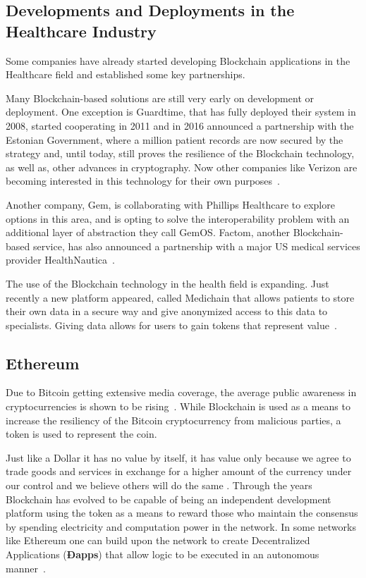 \subsection{Developments and Deployments in the Healthcare Industry}\label{blockchainHealthcare}

Some companies have already started developing Blockchain applications in the
Healthcare field and established some key partnerships.

Many Blockchain-based solutions are still very early on development or
deployment.  One exception is Guardtime, that has fully deployed their system
in 2008, started cooperating in 2011 and in 2016 announced a partnership with
the Estonian Government, where a million patient records are now secured by the
strategy and, until today, still proves the resilience of the Blockchain
technology, as well as, other advances in cryptography.  Now other companies
like Verizon are becoming interested in this technology for their own
purposes~\cite{GuardTime2018,EstonianGovernmentGuardTime2016}.

Another company, Gem, is collaborating with Phillips Healthcare to explore
options in this area, and is opting to solve the interoperability problem with
an additional layer of abstraction they call GemOS.  Factom, another
Blockchain-based service, has also announced a partnership with a major US
medical services provider
HealthNautica~\cite{BlockchainCompHealth2017,FactomPartnership2017}.

The use of the Blockchain technology in the health field is expanding. Just
recently a new platform appeared, called Medichain that allows patients to
store their own data in a secure way and give anonymized access to this data to
specialists. Giving data allows for users to gain tokens that represent
value~\cite{MediChain2018}.

\subsection{Ethereum}

Due to Bitcoin getting extensive media coverage, the average public awareness
in cryptocurrencies is shown to be rising~\cite{BitAwareness2017}. While
Blockchain is used as a means to increase the resiliency of the Bitcoin
cryptocurrency from malicious parties, a token is used to represent the coin. 

Just like a Dollar it has no value by itself, it has value only because we
agree to trade goods and services in exchange for a higher amount of the
currency under our control and we believe others will do the same
\cite{aliessi2016}. Through the years Blockchain has evolved to be capable of
being an independent development platform using the token as a means to reward
those who maintain the consensus by spending electricity and computation power
in the network. In some networks like Ethereum one can build upon the network
to create Decentralized Applications (\textbf{Ðapps}) that allow logic to be
executed in an autonomous manner~\cite{Wood2017}. 

